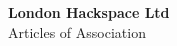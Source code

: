 

\begin{titlepage}
\begin{center}
{\bf \LARGE London Hackspace Ltd}\\[36pt]
{\Large Articles of Association}

\vfill

\end{center}
\end{titlepage}


